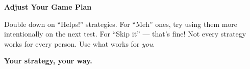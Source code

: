 {\vspace{3mm}

\begin{tcolorbox}[
    enhanced,
    colback=funYellowLight,
    colframe=funYellow!60,
    arc=10pt,
    boxrule=1pt,
    left=6mm, right=6mm, top=4mm, bottom=4mm,
]
{\bfseries\color{funYellowDark} \faLightbulb\hspace{2mm}Adjust Your Game Plan}

\vspace{2mm}

Double down on ``Helps!'' strategies. For ``Meh'' ones, try using them more intentionally on the next test. For ``Skip it'' — that's fine! Not every strategy works for every person. Use what works for \textit{you}.
\end{tcolorbox}

\vspace{4mm}

\begin{center}
{\large\bfseries\color{funOrangeDark} \faSlidersH\hspace{2mm}Your strategy, your way.\hspace{2mm}\faSlidersH}
\end{center}

}
\newpage
